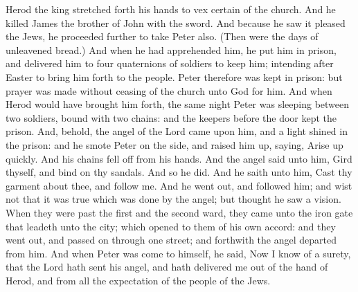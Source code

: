  Herod the king stretched forth his hands to vex certain of the church. And he killed James the brother of John with the sword. And because he saw it pleased the Jews, he proceeded further to take Peter also. (Then were the days of unleavened bread.) And when he had apprehended him, he put him in prison, and delivered him to four quaternions of soldiers to keep him; intending after Easter to bring him forth to the people. Peter therefore was kept in prison: but prayer was made without ceasing of the church unto God for him. And when Herod would have brought him forth, the same night Peter was sleeping between two soldiers, bound with two chains: and the keepers before the door kept the prison. And, behold, the angel of the Lord came upon him, and a light shined in the prison: and he smote Peter on the side, and raised him up, saying, Arise up quickly. And his chains fell off from his hands. And the angel said unto him, Gird thyself, and bind on thy sandals. And so he did. And he saith unto him, Cast thy garment about thee, and follow me. And he went out, and followed him; and wist not that it was true which was done by the angel; but thought he saw a vision. When they were past the first and the second ward, they came unto the iron gate that leadeth unto the city; which opened to them of his own accord: and they went out, and passed on through one street; and forthwith the angel departed from him. And when Peter was come to himself, he said, Now I know of a surety, that the Lord hath sent his angel, and hath delivered me out of the hand of Herod, and from all the expectation of the people of the Jews.


